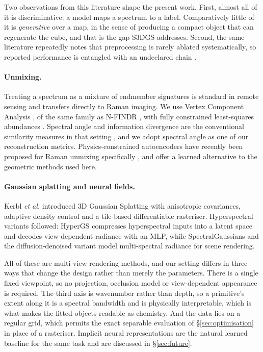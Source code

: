 Two observations from this literature shape the present work. First, almost all
of it is discriminative: a model maps a spectrum to a label. Comparatively
little of it is \emph{generative} over a map, in the sense of producing a
compact object that can regenerate the cube, and that is the gap S3DGS
addresses. Second, the same literature repeatedly notes that preprocessing is
rarely ablated systematically, so reported performance is entangled with an
undeclared chain \cite{tanwar2021advances,barton2022chemometrics}.

\paragraph{Unmixing.}
Treating a spectrum as a mixture of endmember signatures is standard in remote
sensing and transfers directly to Raman imaging. We use Vertex Component
Analysis \cite{nascimento2005vca}, of the same family as N-FINDR
\cite{winter1999nfindr}, with fully constrained least-squares abundances
\cite{heinz2001fully}. Spectral angle \cite{kruse1993spectral} and information
divergence \cite{chang1999spectral} are the conventional similarity measures in
that setting \cite{rozenstein2015comparison}, and we adopt spectral angle as
one of our reconstruction metrics. Physics-constrained autoencoders have
recently been proposed for Raman unmixing specifically
\cite{georgiev2024unmixing}, and offer a learned alternative to the geometric
methods used here.

\paragraph{Gaussian splatting and neural fields.}
Kerbl \emph{et al.} \cite{kerbl20233dgs} introduced 3D Gaussian Splatting with
anisotropic covariances, adaptive density control and a tile-based
differentiable rasteriser. Hyperspectral variants followed: HyperGS
\cite{thirgood2025hypergs} compresses hyperspectral inputs into a latent space
and decodes view-dependent radiance with an MLP, while SpectralGaussians
\cite{spectralgaussians2025} and the diffusion-denoised variant
\cite{ddhgs2025} model multi-spectral radiance for scene rendering.

All of these are multi-view rendering methods, and our setting differs in three
ways that change the design rather than merely the parameters. There is a
single fixed viewpoint, so no projection, occlusion model or view-dependent
appearance is required. The third axis is wavenumber rather than depth, so a
primitive's extent along it is a spectral bandwidth and is physically
interpretable, which is what makes the fitted objects readable as chemistry.
And the data lies on a regular grid, which permits the exact separable
evaluation of \S\ref{sec:optimisation} in place of a rasteriser. Implicit
neural representations \cite{mildenhall2021nerf} are the natural learned
baseline for the same task and are discussed in \S\ref{sec:future}.

